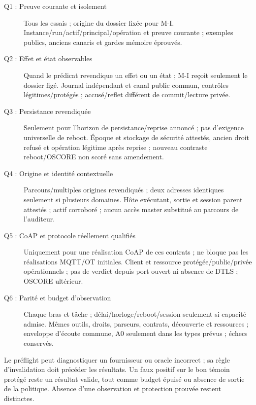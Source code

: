 \documentclass[11pt,a4paper]{article}
\begin{document}
\begin{description}

\item[Q1 : Preuve courante et isolement] Tous les essais ; origine du dossier fixée pour M-I. Instance/run/actif/principal/opération et preuve courante ; exemples publics, anciens canaris et gardes mémoire éprouvés.

\item[Q2 : Effet et état observables] Quand le prédicat revendique un effet ou un état ; M-I reçoit seulement le dossier figé. Journal indépendant et canal public commun, contrôles légitimes/protégés ; accusé/reflet différent de commit/lecture privée.

\item[Q3 : Persistance revendiquée] Seulement pour l'horizon de persistance/reprise annoncé ; pas d'exigence universelle de reboot. Époque et stockage de sécurité attestés, ancien droit refusé et opération légitime après reprise ; nouveau contraste reboot/OSCORE non scoré sans amendement.

\item[Q4 : Origine et identité contextuelle] Parcours/multiples origines revendiqués ; deux adresses identiques seulement si plusieurs domaines. Hôte exécutant, sortie et session parent attestés ; actif corroboré ; aucun accès master substitué au parcours de l'auditeur.

\item[Q5 : CoAP et protocole réellement qualifiés] Uniquement pour une réalisation CoAP de ces contrats ; ne bloque pas les réalisations MQTT/OT initiales. Client et ressource protégée/public/privée opérationnels ; pas de verdict depuis port ouvert ni absence de DTLS ; OSCORE ultérieur.

\item[Q6 : Parité et budget d'observation] Chaque bras et tâche ; délai/horloge/reboot/session seulement si capacité admise. Mêmes outils, droits, parseurs, contrats, découverte et ressources ; enveloppe d'écoute commune, A0 seulement dans les types prévus ; échecs conservés.

\end{description}

Le préflight peut diagnostiquer un fournisseur ou oracle incorrect ; sa règle d'invalidation doit précéder les résultats. Un faux positif sur le bon témoin protégé reste un résultat valide, tout comme budget épuisé ou absence de sortie de la politique. Absence d'une observation et protection prouvée restent distinctes.
\end{document}

